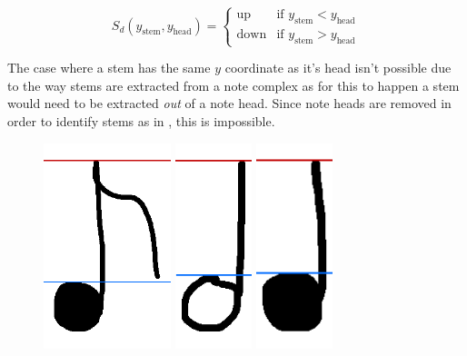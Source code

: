 $$
S_{d} (y_{\text{stem}}, y_{\text{head}}) =
\left\{
	\begin{array}{ll}
		\text{up}   & \mbox{if } y_{\text{stem}} < y_{\text{head}} \\
		\text{down} & \mbox{if } y_{\text{stem}} > y_{\text{head}}
	\end{array}
\right.
$$

The case where a stem has the same $y$ coordinate as it's head isn't possible due to the way stems are extracted from a note complex as for this to happen a stem would need to be extracted \emph{out} of a note head. Since note heads are removed in order to identify stems as in , this is impossible.

\begin{figure}[h!]
    \centering
    \includegraphics[height=6cm]{gfx/techniques/scoring/note-stem-up/4247.png}
    \quad
    \includegraphics[height=6cm]{gfx/techniques/scoring/note-stem-up/6028.png}
    \quad
    \includegraphics[height=6cm]{gfx/techniques/scoring/note-stem-up/6042.png}

\end{figure}
